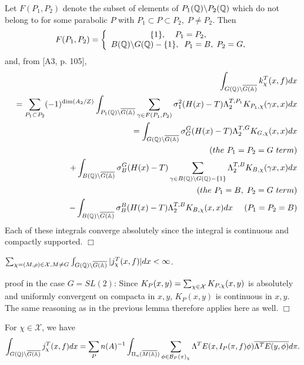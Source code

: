Let $F(P_1,P_2)$ denote the subset of elements of
$P_1(\mathbb{Q} )\backslash P_2(\mathbb{Q} )$ which do not belong
to for some parabolic $P$ with $P_1\subset
P\subset P_2,\;P\neq P_2$. Then 
\[
F(P_1,P_2)=\left\{ 
\begin{array}{c}
\{1\},\;\;\;\;P_1=P_2, \\ 
B(\mathbb{Q} )\backslash G(\mathbb{Q} )-\{1\},\;\;P_1=B,\;P_2=G,
\end{array}
\right. 
\]
and, from [A3, p. 105], 
\begin{eqnarray*}
&&\int_{G(\mathbb{Q} )\backslash \overline{G(\mathbb{A} )}}
k_\chi ^T(x,f)dx \\
&&=\sum_{P_1\subset P_2}(-1)^{\dim (A_2/Z)}
\int_{P_1(\mathbb{Q} )\backslash \overline{G(\mathbb{A} )}}
\sum_{\gamma \in F(P_1,P_2)}\sigma _1^2(H(x)-T)
\Lambda_2^{T,P_1}K_{P_1,\chi }(\gamma x,x)dx \\
&&=\int_{G(\mathbb{Q} )\backslash \overline{G(\mathbb{A} )}}
\sigma _G^G(H(x)-T)\Lambda_2^{T,G}K_{G,\chi }(x,x)dx\\
&&\;\;\;\;\;(the\ P_1=P_2=G\ term) \\
&&+\int_{B(\mathbb{Q} )\backslash \overline{G(\mathbb{A} )}}
\sigma _B^G(H(x)-T)
\sum_{\gamma\in B(\mathbb{Q} )\backslash G(\mathbb{Q} )-\{1\}}
\Lambda _2^{T,B}K_{B,\chi }(\gamma x,x)dx\\
&&\;\;\;\;\;(the\ P_1 =B,\;P_2=G\ term) \\
&&-\int_{B(\mathbb{Q} )\backslash \overline{G(\mathbb{A} )}}
\sigma _B^B(H(x)-T)\Lambda_2^{T,B}K_{B,\chi }(x,x)dx
\;\;\;\;\;(P_1 =P_2=B)
\end{eqnarray*}
Each of these integrals converge absolutely since the integral is continuous
and compactly supported. $\Box $

\begin{lemma}
$\sum_{ \chi =(M,\rho )\in \mathcal{X}, M\neq G }
\int_{G(\mathbb{Q} )\backslash \overline{G(\mathbb{A} )}}
|j_\chi ^T(x,f)|dx<\infty $.
\end{lemma}

proof in the case $G=SL(2)$: Since
$K_P(x,y)=\sum_{\chi \in {\cal{X}}}K_{P,\chi }(x,y)$
is absolutely and uniformly convergent on compacta in
$x,y $, $K_P(x,y)$ is continuous in $x,y$. The same
reasoning as in the
previous lemma therefore applies here as well. $\Box $

\begin{lemma}
For $\chi \in \mathcal{X}$, we have 
\[
\int_{G(\mathbb{Q} )\backslash \overline{G(\mathbb{A} )}}
j_\chi^T(x,f)dx=\sum_Pn(A)^{-1}
\int_{\Pi _u(\overline{M(\mathbb{A} )})}
\sum_{\phi \in {\cal{B}}_P(\pi )_\chi }
\Lambda ^TE(x,I_P(\pi ,f)\phi )\overline{\Lambda ^TE(y,\phi )}d\pi .
\]
\end{lemma}

